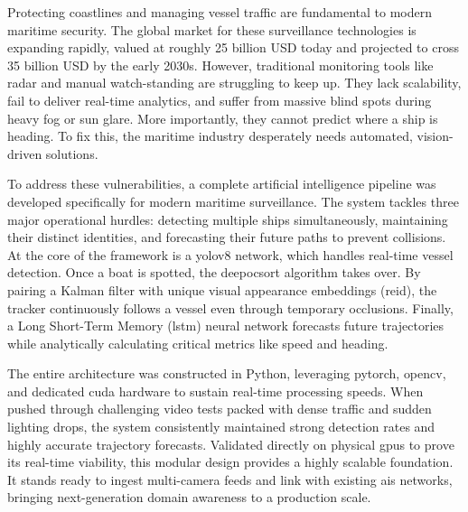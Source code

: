 \vspace{-1cm}

Protecting coastlines and managing vessel traffic are fundamental to modern maritime security. The global market for these surveillance technologies is expanding rapidly, valued at roughly 25 billion USD today and projected to cross 35 billion USD by the early 2030s. However, traditional monitoring tools like radar and manual watch-standing are struggling to keep up. They lack scalability, fail to deliver real-time analytics, and suffer from massive blind spots during heavy fog or sun glare. More importantly, they cannot predict where a ship is heading. To fix this, the maritime industry desperately needs automated, vision-driven solutions.

To address these vulnerabilities, a complete artificial intelligence pipeline was developed specifically for modern maritime surveillance. The system tackles three major operational hurdles: detecting multiple ships simultaneously, maintaining their distinct identities, and forecasting their future paths to prevent collisions. At the core of the framework is a \gls{yolov8} network, which handles real-time vessel detection. Once a boat is spotted, the \gls{deepocsort} algorithm takes over. By pairing a Kalman filter with unique visual appearance embeddings (\gls{reid}), the tracker continuously follows a vessel even through temporary occlusions. Finally, a Long Short-Term Memory (\gls{lstm}) neural network forecasts future trajectories while analytically calculating critical metrics like speed and heading.

The entire architecture was constructed in Python, leveraging \gls{pytorch}, \gls{opencv}, and dedicated \gls{cuda} hardware to sustain real-time processing speeds. When pushed through challenging video tests packed with dense traffic and sudden lighting drops, the system consistently maintained strong detection rates and highly accurate trajectory forecasts. Validated directly on physical \glspl{gpu} to prove its real-time viability, this modular design provides a highly scalable foundation. It stands ready to ingest multi-camera feeds and link with existing \gls{ais} networks, bringing next-generation domain awareness to a production scale.

\pagebreak
